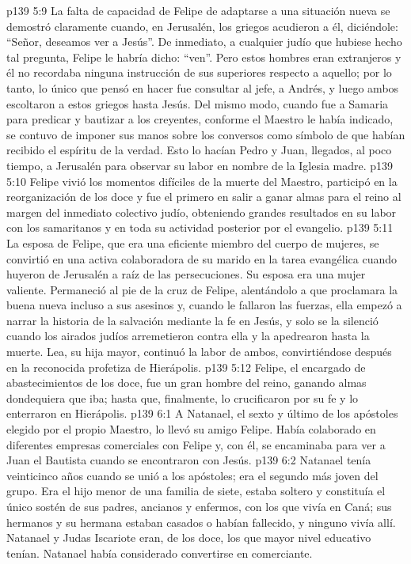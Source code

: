 \vs p139 5:9 La falta de capacidad de Felipe de adaptarse a una situación nueva se demostró claramente cuando, en Jerusalén, los griegos acudieron a él, diciéndole: “Señor, deseamos ver a Jesús”. De inmediato, a cualquier judío que hubiese hecho tal pregunta, Felipe le habría dicho: “ven”. Pero estos hombres eran extranjeros y él no recordaba ninguna instrucción de sus superiores respecto a aquello; por lo tanto, lo único que pensó en hacer fue consultar al jefe, a Andrés, y luego ambos escoltaron a estos griegos hasta Jesús. Del mismo modo, cuando fue a Samaria para predicar y bautizar a los creyentes, conforme el Maestro le había indicado, se contuvo de imponer sus manos sobre los conversos como símbolo de que habían recibido el espíritu de la verdad. Esto lo hacían Pedro y Juan, llegados, al poco tiempo, a Jerusalén para observar su labor en nombre de la Iglesia madre.
\vs p139 5:10 Felipe vivió los momentos difíciles de la muerte del Maestro, participó en la reorganización de los doce y fue el primero en salir a ganar almas para el reino al margen del inmediato colectivo judío, obteniendo grandes resultados en su labor con los samaritanos y en toda su actividad posterior por el evangelio.
\vs p139 5:11 \pc La esposa de Felipe, que era una eficiente miembro del cuerpo de mujeres, se convirtió en una activa colaboradora de su marido en la tarea evangélica cuando huyeron de Jerusalén a raíz de las persecuciones. Su esposa era una mujer valiente. Permaneció al pie de la cruz de Felipe, alentándolo a que proclamara la buena nueva incluso a sus asesinos y, cuando le fallaron las fuerzas, ella empezó a narrar la historia de la salvación mediante la fe en Jesús, y solo se la silenció cuando los airados judíos arremetieron contra ella y la apedrearon hasta la muerte. Lea, su hija mayor, continuó la labor de ambos, convirtiéndose después en la reconocida profetiza de Hierápolis.
\vs p139 5:12 \pc Felipe, el encargado de abastecimientos de los doce, fue un gran hombre del reino, ganando almas dondequiera que iba; hasta que, finalmente, lo crucificaron por su fe y lo enterraron en Hierápolis.
\vs p139 6:1 A Natanael, el sexto y último de los apóstoles elegido por el propio Maestro, lo llevó su amigo Felipe. Había colaborado en diferentes empresas comerciales con Felipe y, con él, se encaminaba para ver a Juan el Bautista cuando se encontraron con Jesús.
\vs p139 6:2 Natanael tenía veinticinco años cuando se unió a los apóstoles; era el segundo más joven del grupo. Era el hijo menor de una familia de siete, estaba soltero y constituía el único sostén de sus padres, ancianos y enfermos, con los que vivía en Caná; sus hermanos y su hermana estaban casados o habían fallecido, y ninguno vivía allí. Natanael y Judas Iscariote eran, de los doce, los que mayor nivel educativo tenían. Natanael había considerado convertirse en comerciante.
